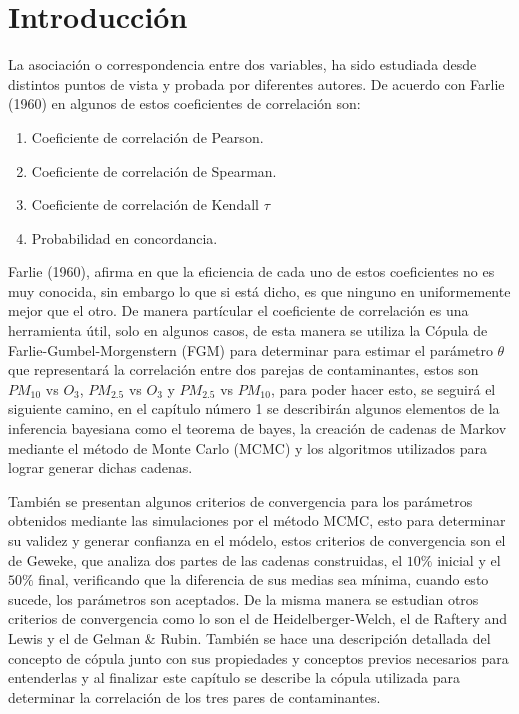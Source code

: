 \chapter*{Introducción}


La asociación o correspondencia entre dos variables, ha sido estudiada desde distintos puntos de vista y probada por diferentes autores. De acuerdo con Farlie (1960) en \cite{farlie} algunos de estos coeficientes de correlación son: 

\begin{enumerate}
\item Coeficiente de correlación de Pearson.
\item Coeficiente de correlación de Spearman.
\item Coeficiente de correlación de Kendall $\tau$
\item Probabilidad en concordancia. 
\end{enumerate}

Farlie (1960), afirma en \cite{farlie} que la eficiencia de cada uno de estos coeficientes no es muy conocida, sin embargo lo que si está dicho, es que ninguno en uniformemente mejor que el otro. De manera partícular el coeficiente de correlación es una herramienta útil, solo en algunos casos, de esta manera se utiliza la Cópula de Farlie-Gumbel-Morgenstern (FGM) para determinar para estimar el parámetro $\theta$ que representará la correlación entre dos parejas de contaminantes, estos son $PM_{10}$ vs $O_3$, $PM_{2.5}$ vs $O_3$ y $PM_{2.5}$ vs $PM_{10}$, para poder hacer esto, se seguirá el siguiente camino, en el capítulo número 1 se describirán algunos elementos de la inferencia bayesiana como el teorema de bayes, la creación de cadenas de Markov mediante el método de Monte Carlo (MCMC) y los algoritmos utilizados para lograr generar dichas cadenas. 

También se presentan algunos criterios de convergencia para los parámetros obtenidos mediante las simulaciones por el método MCMC, esto para determinar su validez y generar confianza en el módelo, estos criterios de convergencia son el de Geweke, que analiza dos partes de las cadenas construidas, el $10\%$ inicial y el $50\%$ final, verificando que la diferencia de sus medias sea mínima, cuando esto sucede, los parámetros son aceptados. De la misma manera se estudian otros criterios de convergencia como lo son el de Heidelberger-Welch, el de Raftery and Lewis y el de Gelman $\&$ Rubin. 
También se hace una descripción detallada del concepto de cópula junto con sus propiedades y conceptos previos necesarios para entenderlas y al finalizar este capítulo se describe la cópula utilizada para determinar la correlación de los tres pares de contaminantes. 

